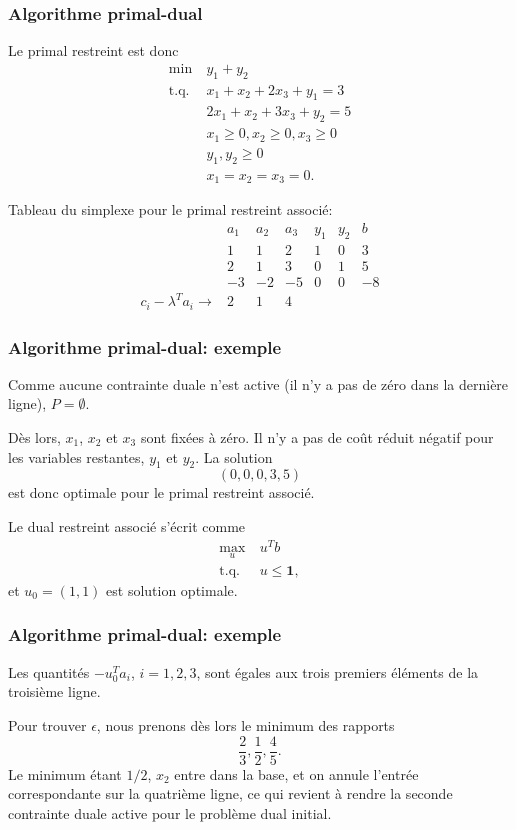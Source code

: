 \documentclass[t, aspectratio=169, usepdftitle=false]{beamer}
\def\bone{\boldsymbol{1}}
\begin{document}
\begin{frame}
\frametitle{Algorithme primal-dual}

Le primal restreint est donc
\begin{align*}
\min\ & y_1 + y_2 \\
\mbox{t.q. } & x_1 + x_2 + 2x_3 + y_1 = 3 \\
& 2x_1 + x_2 + 3x_3 + y_2 = 5 \\
& x_1 \geq 0, x_2 \geq 0, x_3 \geq 0 \\
& y_1, y_2 \geq 0 \\
& x_1 = x_2 = x_3 = 0.
\end{align*}

Tableau du simplexe pour le primal restreint associé:
\[
\begin{matrix}
& a_1 & a_2 & a_3 & y_1 & y_2 & b \\
& 1 & 1 & 2 & 1 & 0 & 3 \\
& 2 & 1 & 3 & 0 & 1 & 5 \\
& -3 & -2 & -5 & 0 & 0 & -8 \\
c_i - \lambda^Ta_i \rightarrow & 2 & 1 & 4
\end{matrix}
\]

\end{frame}

\begin{frame}
\frametitle{Algorithme primal-dual: exemple}

Comme aucune contrainte duale n'est active (il n'y a pas de zéro dans la dernière ligne), $P = \emptyset$.

\mbox{}

Dès lors, $x_1$, $x_2$ et $x_3$ sont fixées à zéro. Il n'y a pas de coût réduit négatif pour les variables restantes, $y_1$ et $y_2$. La solution
\[
(0, 0, 0, 3, 5)
\]
est donc optimale pour le primal restreint associé.

\mbox{}

Le dual restreint associé s'écrit comme
\begin{align*}
\max_u\ & u^T b\\
\mbox{t.q. } & u \leq \bone,
\end{align*}
et $u_0 = (1,1)$ est solution optimale.

\end{frame}

\begin{frame}
\frametitle{Algorithme primal-dual: exemple}

Les quantités $-u_0^Ta_i$, $i = 1, 2, 3$, sont égales aux trois premiers éléments de la troisième ligne.

\mbox{}

Pour trouver $\epsilon$, nous prenons dès lors le minimum des rapports
\[
\frac{2}{3}, \frac{1}{2}, \frac{4}{5}.
\]
Le minimum étant $1/2$, $x_2$ entre dans la base, et on annule l'entrée correspondante sur la quatrième ligne, ce qui revient à rendre la seconde contrainte duale active pour le problème dual initial.

\end{frame}
\end{document}

